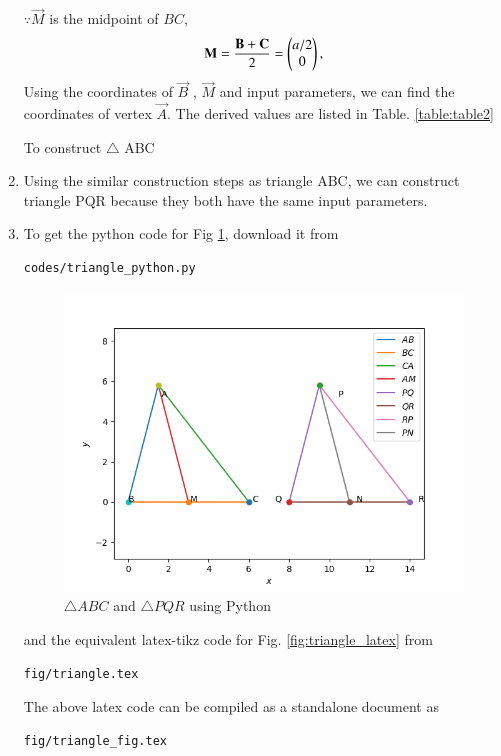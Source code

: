 \begin{enumerate}[label=\thesection.\arabic*.,ref=\thesection.\theenumi]
$\because \vec{M}$ is the midpoint of $BC$,
\begin{align}
\mathbf{M}= \frac{\mathbf{B}+\mathbf{C}}{2} =\begin{pmatrix}a/2\\0\end{pmatrix},
\label{eq:constr_m}
\end{align}
Using the coordinates of $\vec{B}$ , $\vec{M}$ and input parameters, we can find the coordinates of vertex $\vec{A}$. 
The derived values are listed in  
Table. \ref{table:table2} 
\begin{table}[ht!]
\centering

\caption{To construct $\triangle $ ABC}
\label{table:table2}
\end{table}
%
\item Using the similar construction steps as triangle ABC, we can construct triangle PQR because they both have the same input parameters.
%
\\
\item To get the python code for Fig \ref{fig:triangle_python}, download it from
\begin{lstlisting}
codes/triangle_python.py
\end{lstlisting}
\begin{figure}[!ht]
\centering
\includegraphics[width= \columnwidth]{Figure_1.png}
\caption{$\triangle ABC$ and $\triangle PQR$ using Python}
\label{fig:triangle_python}
\end{figure}
%
and the equivalent latex-tikz code for Fig. \ref{fig:triangle_latex} from
\begin{lstlisting}
fig/triangle.tex
\end{lstlisting}
%
The above latex code can be compiled as a standalone document as
\begin{lstlisting}
fig/triangle_fig.tex
\end{lstlisting}



\end{enumerate}